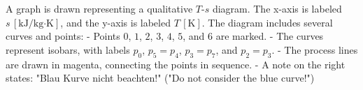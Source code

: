 A graph is drawn representing a qualitative \( T \)-\( s \) diagram. The x-axis is labeled \( s \, [\text{kJ/kg·K}] \), and the y-axis is labeled \( T \, [\text{K}] \). The diagram includes several curves and points:  
- Points \( 0 \), \( 1 \), \( 2 \), \( 3 \), \( 4 \), \( 5 \), and \( 6 \) are marked.  
- The curves represent isobars, with labels \( p_0 \), \( p_5 = p_4 \), \( p_3 = p_7 \), and \( p_2 = p_3 \).  
- The process lines are drawn in magenta, connecting the points in sequence.  
- A note on the right states: "Blau Kurve nicht beachten!" ("Do not consider the blue curve!")